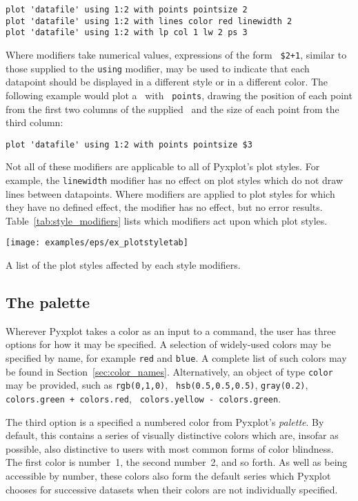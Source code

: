 \begin{verbatim}
plot 'datafile' using 1:2 with points pointsize 2
plot 'datafile' using 1:2 with lines color red linewidth 2
plot 'datafile' using 1:2 with lp col 1 lw 2 ps 3
\end{verbatim}

\noindent Where modifiers take numerical values, expressions of the form {\tt
\$2+1}, similar to those supplied to the {\tt using} modifier, may be used to
indicate that each datapoint should be displayed in a different style or in a
different color. The following example would plot a \datafile\ with {\tt
points}, drawing the position of each point from the first two columns of the
supplied \datafile\ and the size of each point from the third column:
\begin{verbatim}
plot 'datafile' using 1:2 with points pointsize $3
\end{verbatim}

Not all of these modifiers are applicable to all of Pyxplot's plot styles. For
example, the {\tt line\-width} modifier has no effect on plot styles which do
not draw lines between datapoints. Where modifiers are applied to plot styles
for which they have no defined effect, the modifier has no effect, but no error
results.  Table~\ref{tab:style_modifiers} lists which modifiers act upon which
plot styles.

\begin{table}
\centerline{\texttt{[image: examples/eps/ex\_plotstyletab]}}
\caption{A list of the plot styles affected by each style modifiers.}
\label{tab:style_modifiers}
\end{table}

\subsection{The palette}
\label{sec:palette}

Wherever Pyxplot takes a color as an input to a command, the user has three
options for how it may be specified.  A selection of widely-used colors may be
specified by name, for example {\tt red} and {\tt blue}. A complete list of
such colors may be found in Section~\ref{sec:color_names}. Alternatively, an
object of type {\tt color} may be provided, such as {\tt rgb(0,1,0)}, {\tt
hsb(0.5,0.5,0.5)}, {\tt gray(0.2)}, {\tt colors.green + colors.red}, {\tt
colors.yellow - colors.green}.

The third option is a specified a numbered color from Pyxplot's {\it palette}.
By default, this contains a series of visually distinctive colors which are,
insofar as possible, also distinctive to users with most common forms of color
blindness.  The first color is number~1, the second number~2, and so forth. As
well as being accessible by number, these colors also form the default series
which Pyxplot chooses for successive datasets when their colors are not
individually specified.


